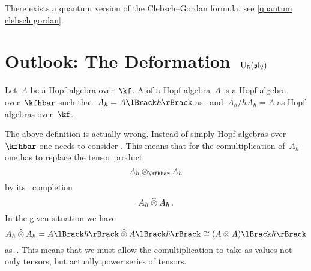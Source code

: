 \documentclass[a4paper, 11pt, oneside]{scrartcl}
\begin{document}
There exists a quantum version of the Clebsch--Gordan formula, see \cref{quantum clebsch gordan}.



\section{Outlook: The Deformation~$\operatorname{U}_{\hbar}(\mathfrak{sl}_2)$}

\begin{definition}
  Let~$A$ be a Hopf algebra over~$\kf$.
  A  of a Hopf algebra~$A$ is a Hopf algebra over~$\kfhbar$ such that~$A_\hbar = \power{A}{\hbar}$ as~\modules{$\kfhbar$} and~$A_\hbar / \hbar A_\hbar = A$ as Hopf algebras over~$\kf$.
\end{definition}

\begin{remark}
      The above definition is actually wrong.
      Instead of simply Hopf algebras over~$\kfhbar$ one needs to consider .
      This means that for the comultiplication of~$A_\hbar$ one has to replace the tensor product
      \[
        A_\hbar \tensor_{\kfhbar} A_\hbar
      \]
      by its~\adic{$\hbar$} completion
      \[
        A_\hbar \mathbin{\widehat{\otimes}} A_\hbar \,.
      \]
      In the given situation we have
      \[
        A_\hbar \ctensor A_\hbar
        =
        \power{A}{\hbar} \ctensor \power{A}{\hbar}
        \cong
        \power{(A \tensor A)}{\hbar}
      \]
      as~\modules{$\kfhbar$}.
      This means that we must allow the comultiplication to take as values not only tensors, but actually power series of tensors.

\end{remark}
\end{document}
